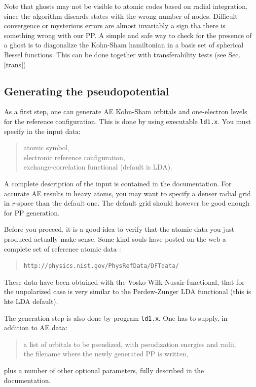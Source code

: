 \documentclass[12pt,a4paper]{article}
\begin{document}
Note that ghosts may not be visible to atomic codes based on radial
integration, since the algorithm discards states with the wrong number 
of nodes. Difficult convergence or mysterious errors are almost invariably
a sign tha there is something wrong with our PP. 
A simple and safe way to check for the presence of a ghost is to diagonalize 
the Kohn-Sham hamiltonian in a basis set of spherical Bessel functions. 
This can be done together with transferability tests
(see Sec.\ref{trans})

\subsection{Generating the pseudopotential}

As a first step, one can generate AE Kohn-Sham orbitals and one-electron 
levels for the reference configuration. This is done by using executable
\texttt{ld1.x}. You must specify in the input data:
\begin{quote} 
atomic symbol,\\
electronic reference configuration,\\
exchange-correlation functional (default is LDA).
\end{quote}
A complete description of the input is contained in the documentation.
For accurate AE results in heavy atoms, you may want to specify a denser 
radial grid in $r$-space than the default one. The default grid should
however be good enough for PP generation.

Before you proceed, it is a good idea to verify that the atomic data
you just produced actually make sense. Some kind souls have posted on
the web a complete set of reference atomic data :
\begin{quote}
{\tt http://physics.nist.gov/PhysRefData/DFTdata/ }
\end{quote}
These data have been obtained with the Vosko-Wilk-Nusair functional,
that for the unpolarized case is very similar to the Perdew-Zunger 
LDA functional (this is hte LDA default).

The generation step is also done by program \texttt{ld1.x}.
One has to supply, in addition to AE data: 
\begin{quote}
a list of orbitals to be pseudized, with pseudization energies and radii,\\
the filename where the newly generated PP is written,
\end{quote}
plus a number of other optional parameters, 
fully described in the documentation.
\end{document}
